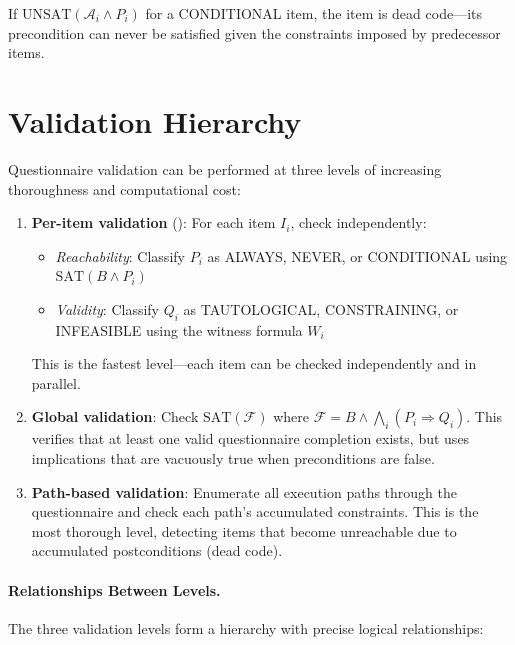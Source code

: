 If $\mathrm{UNSAT}(\mathcal{A}_i \wedge P_i)$ for a CONDITIONAL item, the item is dead code—its precondition can never be satisfied given the constraints imposed by predecessor items.

\section{Validation Hierarchy}

Questionnaire validation can be performed at three levels of increasing thoroughness and computational cost:

\begin{enumerate}
    \item \textbf{Per-item validation} (): For each item $I_i$, check independently:
    \begin{itemize}
        \item \emph{Reachability}: Classify $P_i$ as ALWAYS, NEVER, or CONDITIONAL using $\mathrm{SAT}(B \wedge P_i)$
        \item \emph{Validity}: Classify $Q_i$ as TAUTOLOGICAL, CONSTRAINING, or INFEASIBLE using the witness formula $W_i$
    \end{itemize}
    This is the fastest level—each item can be checked independently and in parallel.

    \item \textbf{Global validation}: Check $\mathrm{SAT}(\mathcal{F})$ where $\mathcal{F} = B \wedge \bigwedge_i (P_i \Rightarrow Q_i)$.
    This verifies that at least one valid questionnaire completion exists, but uses implications that are vacuously true when preconditions are false.

    \item \textbf{Path-based validation}: Enumerate all execution paths through the questionnaire and check each path's accumulated constraints. This is the most thorough level, detecting items that become unreachable due to accumulated postconditions (dead code).
\end{enumerate}

\paragraph{Relationships Between Levels.}

The three validation levels form a hierarchy with precise logical relationships:

